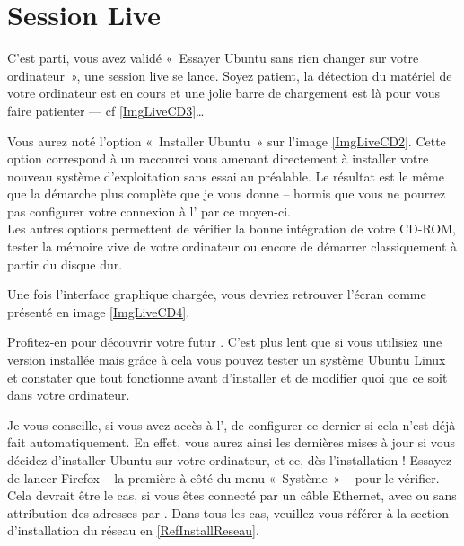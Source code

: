 \section{Session Live}
\label{RefSessionLive}
C'est parti, vous avez validé «~Essayer Ubuntu sans rien changer sur votre ordinateur~», une session live se lance. Soyez patient, la détection du matériel de votre ordinateur est en cours et une jolie barre de chargement est là pour vous faire patienter --- cf \ref{ImgLiveCD3}\ldots{}\par
{}
\begin{nota}
Vous aurez noté l'option «~Installer Ubuntu~» sur l'image \ref{ImgLiveCD2}. Cette option correspond à un raccourci vous amenant directement à installer votre nouveau système d'exploitation sans essai au préalable. Le résultat est le même que la démarche plus complète que je vous donne -- hormis que vous ne pourrez pas configurer votre connexion à l' par ce moyen-ci.\\
Les autres options permettent de vérifier la bonne intégration de votre CD-ROM, tester la mémoire vive de votre ordinateur ou encore de démarrer classiquement à partir du disque dur.
\end{nota}
Une fois l'interface graphique chargée, vous devriez retrouver l'écran comme présenté en image \ref{ImgLiveCD4}.\par
{}
Profitez-en pour découvrir votre futur . C'est plus lent que si vous utilisiez une version installée mais grâce à cela vous pouvez tester un système Ubuntu Linux et constater que tout fonctionne avant d'installer et de modifier quoi que ce soit dans votre ordinateur.
\begin{nota}
Je vous conseille, si vous avez accès à l', de configurer ce dernier si cela n'est déjà fait automatiquement. En effet, vous aurez ainsi les dernières mises à jour si vous décidez d'installer Ubuntu sur votre ordinateur, et ce, dès l'installation ! Essayez de lancer Firefox -- la première  à côté du menu «~Système~» -- pour le vérifier. Cela devrait être le cas, si vous êtes connecté par un câble Ethernet,  avec ou sans attribution des adresses par . Dans tous les cas, veuillez vous référer à la section d'installation du réseau en \ref{RefInstallReseau}.
\end{nota}
